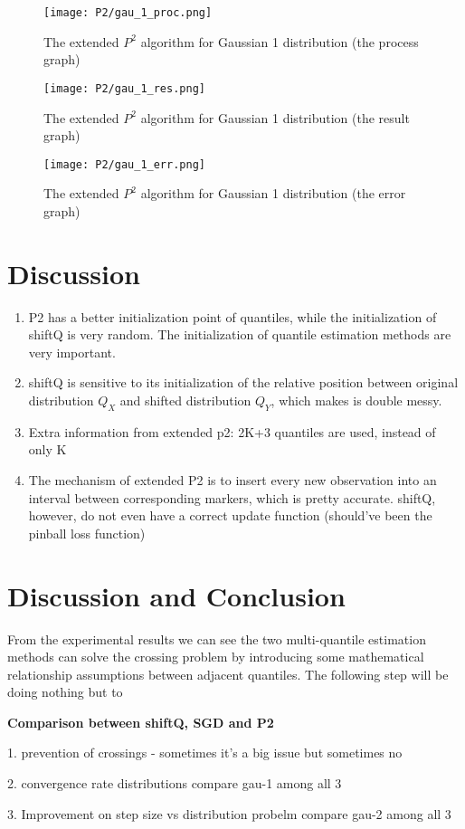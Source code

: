 \begin{figure}[h!]
	\texttt{[image: P2/gau\_1\_proc.png]}
    \caption{The extended $P^2$ algorithm for Gaussian 1 distribution (the process graph)}
    \label{fig: p2_proc}
\end{figure}

\begin{figure}[h!]
	\texttt{[image: P2/gau\_1\_res.png]}
	\caption{The extended $P^2$ algorithm for Gaussian 1 distribution (the result graph)}
    \label{fig: p2_res}
\end{figure}

\begin{figure}[h!]
	\texttt{[image: P2/gau\_1\_err.png]}
    \caption{The extended $P^2$ algorithm for Gaussian 1 distribution (the error graph)}
    \label{fig: p2_err}
\end{figure}

\section{Discussion}
\begin{enumerate}
    \item  P2 has a better initialization point of quantiles, while the initialization of shiftQ is very random. The initialization of quantile estimation methods are very important.
    \item shiftQ is sensitive to its initialization of the relative position between original distribution $Q_X$ and shifted distribution $Q_Y$, which makes is double messy.
    \item Extra information from extended p2: 2K+3 quantiles are used, instead of only K
    \item The mechanism of extended P2 is to insert every new observation into an interval between corresponding markers, which is pretty accurate. shiftQ, however, do not even have a correct update function (should've been the pinball loss function)
\end{enumerate}

\section{Discussion and Conclusion}
\label{sec: multi_discussion}

From the experimental results we can see the two multi-quantile estimation methods can solve the crossing problem by introducing some mathematical relationship assumptions between adjacent quantiles. The following step will be doing nothing but to 

\textbf{Comparison between shiftQ, SGD and P2}

1. prevention of crossings - sometimes it's a big issue but sometimes no

2. convergence rate distributions
    compare gau-1 among all 3

3. Improvement on step size vs distribution probelm
    compare gau-2 among all 3